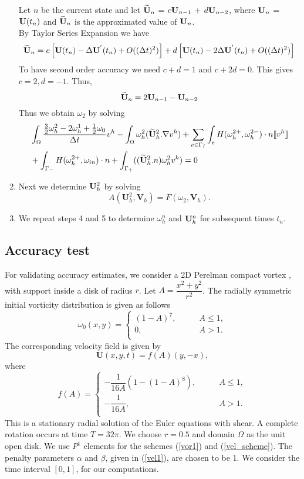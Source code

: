 \documentclass[11pt]{article}
\begin{document}
\begin{enumerate}
Let $n$ be the current state and let $\widetilde{{\bf{U}}}_n$ = $c{\bf{U}}_{n-1}$ + $d{\bf{U}}_{n-2}$, where 
${\bf{U}}_n$ = ${\bf{U}}(t_n)$ and $\widetilde{{\bf{U}}}_n$ is the approximated value of ${\bf{U}}_n$. \\
By Taylor Series Expansion we have
$$
\widetilde{{\bf{U}}}_n = c\left[{\bf{U}}(t_n)-\Delta{\bf{U}}^{'}(t_n) + O((\Delta{t})^2)\right]
           + d\left[{\bf{U}}(t_n)-2\Delta{\bf{U}}^{'}(t_n) + O((\Delta{t})^2)\right]
$$
To have second order accuracy we need $ c+d = 1$ and $ c+2d = 0$. This gives $c=2, d=-1$. Thus,
$$
\widetilde{{\bf{U}}}_n = 2{\bf{U}}_{n-1} - {\bf{U}}_{n-2}
$$
Thus we obtain $\omega_2$ by solving
\begin{equation}
\begin{aligned}
& \int_\Omega\frac{\frac{3}{2}\omega^2_h-2\omega^1_h+\frac{1}{2}\omega_0}{\Delta{t}}{v^h}
-\int_\Omega\omega^2_h(\widetilde{{\bf{U}}}^2_h.\nabla{v^h})
+\displaystyle{\sum_{e\in\Gamma_I}}\int_e H(\omega^{2+}_h,\omega^{2-}_h)\cdot{n}\text{\textlbrackdbl{$v^h$}\textrbrackdbl}\\
&+\int_{\Gamma_-}H(\omega^{2+}_h,\omega_{in})\cdot{n}
+\int_{\Gamma_+}((\widetilde{{\bf{U}}}^2_h.n)\omega^2_h{v^h})=0\\
\end{aligned}
\end{equation}
\item Next we determine ${\bf{U}}^2_h$ by solving
$$
A(\textbf{U}^2_h,\textbf{V}_h)=F(\omega_2,\textbf{V}_h).
$$
\item We repeat steps 4 and 5 to determine $\omega^n_h$ and ${\bf{U}}^n_h$ for subsequent times $t_n$.
\end{enumerate}
\subsection{Accuracy test}
For validating accuracy estimates, we consider a 2D Perelman compact vortex \cite{Perelman, strain}, with support inside a disk of radius $r$. Let $A=\dfrac{x^2+y^2}{r^2}$. The radially symmetric initial vorticity distribution is given as follows
\[
\omega_0(x,y)=
\begin{cases}
(1-A)^7, &\qquad A \leq 1,\\
0, &\qquad A >1.\\
\end{cases}
\]
The corresponding velocity field is given by 
\[
\textbf{U}(x,y,t) = f(A)(y,-x),
\]
where 
\[
f(A) = 
\begin{cases}
-\dfrac{1}{16A}(1-(1-A)^8), &\qquad A \leq 1,\\
-\dfrac{1}{16A}, &\qquad A > 1.\\
\end{cases}
\]
This is a stationary radial solution of the Euler equations with shear. A complete rotation occurs at time $T=32\pi$. We choose $r=0.5$ and domain $\Omega$ as the unit open disk. We use $P^1$ elements for the schemes (\ref{vor1}) and (\ref{vel_scheme}). The penalty parameters $\alpha$ and $\beta$, given in (\ref{vel1}), are chosen to be 1. We consider the time interval $[0,1]$, for our computations. 
\end{document}
